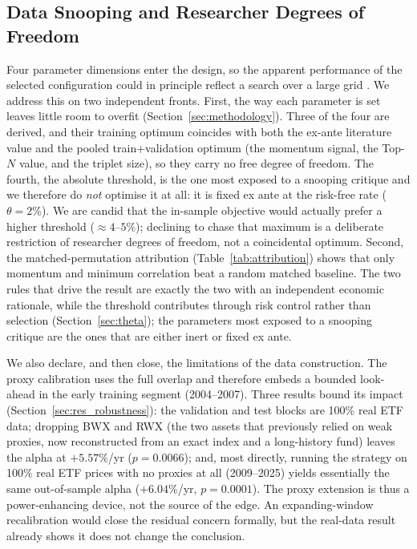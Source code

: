 \subsection{Data Snooping and Researcher Degrees of Freedom}

Four parameter dimensions enter the design, so the apparent performance of the
selected configuration could in principle reflect a search over a large grid
\citep{white2000, harvey2018}. We address this on two independent fronts.
First, the way each parameter is set leaves little room to overfit
(Section~\ref{sec:methodology}). Three of the four are derived, and their
training optimum coincides with both the ex-ante literature value and the pooled
train+validation optimum (the momentum signal, the Top-$N$ value, and the triplet
size), so they carry no free degree of freedom. The fourth, the absolute threshold,
is the one most exposed to a snooping critique and we therefore do \emph{not}
optimise it at all: it is fixed ex ante at the risk-free rate ($\theta=2\%$). We are
candid that the in-sample objective would actually prefer a higher threshold
($\approx 4$--$5\%$); declining to chase that maximum is a deliberate restriction of
researcher degrees of freedom, not a coincidental optimum. Second, the
matched-permutation attribution (Table~\ref{tab:attribution}) shows that only
momentum and minimum correlation beat a random matched baseline. The two rules that
drive the result are exactly the two with an independent economic rationale, while
the threshold contributes through risk control rather than selection
(Section~\ref{sec:theta}); the parameters most exposed to a snooping critique are
the ones that are either inert or fixed ex ante.

We also declare, and then close, the limitations of the data construction. The
proxy calibration uses the full overlap and therefore embeds a bounded look-ahead
in the early training segment (2004--2007). Three results bound its impact
(Section~\ref{sec:res_robustness}): the validation and test blocks are 100\% real
ETF data; dropping BWX and RWX (the two assets that previously relied on weak
proxies, now reconstructed from an exact index and a long-history fund) leaves the
alpha at $+5.57\%$/yr ($p = 0.0066$); and, most directly, running the strategy on 100\%
real ETF prices with no proxies at all (2009--2025) yields essentially the same
out-of-sample alpha ($+6.04\%$/yr, $p = 0.0001$). The proxy extension is thus a
power-enhancing device, not the source of the edge. An expanding-window
recalibration would close the residual concern formally, but the real-data result
already shows it does not change the conclusion.

